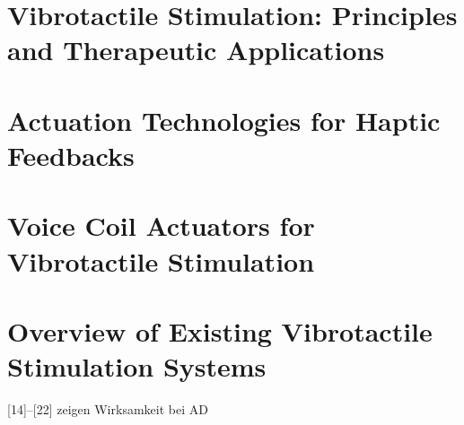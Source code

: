 \section{Vibrotactile Stimulation: Principles and Therapeutic Applications}
\cite{Campbell.2022}

\cite{ClementsCortes.2016, Heesterbeek.2019,Lam.2018, Clair.1993, Kim.2018, ClementsCortes.2017, Mercado.2006, ClementsCortes.2017b, ClementsCortes.2022}


\section{Actuation Technologies for Haptic Feedbacks}

\section{Voice Coil Actuators for Vibrotactile Stimulation}

\section{Overview of Existing Vibrotactile Stimulation Systems}


[14]–[22] zeigen Wirksamkeit bei AD
